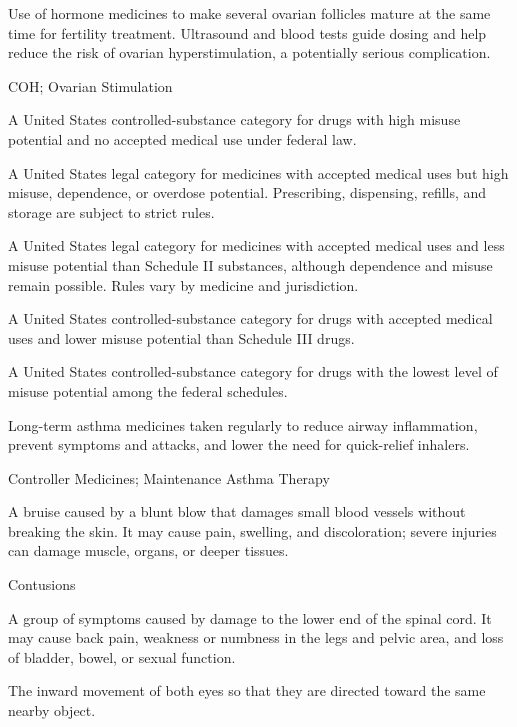  Use of hormone medicines to make several ovarian follicles mature at the same time for fertility treatment. Ultrasound and blood tests guide dosing and help reduce the risk of ovarian hyperstimulation, a potentially serious complication.

\synonyms
COH; Ovarian Stimulation

 A United States controlled-substance category for drugs with high misuse potential and no accepted medical use
under federal law.

 A United States legal category for medicines with accepted medical uses but high misuse, dependence, or overdose potential. Prescribing, dispensing, refills, and storage are subject to strict rules.

 A United States legal category for medicines with accepted medical uses and less misuse potential than Schedule II substances, although dependence and misuse remain possible. Rules vary by medicine and jurisdiction.

 A United States controlled-substance category for drugs with accepted medical uses and lower misuse potential
than Schedule III drugs.

 A United States controlled-substance category for drugs with the lowest level of misuse potential among the
federal schedules.

 Long-term asthma medicines taken regularly to reduce airway inflammation, prevent symptoms and attacks, and lower the need for quick-relief inhalers.

\synonyms
Controller Medicines; Maintenance Asthma Therapy

 A bruise caused by a blunt blow that damages small blood vessels without breaking the skin. It may cause pain, swelling, and discoloration; severe injuries can damage muscle, organs, or deeper tissues.

\synonyms
Contusions

 A group of symptoms caused by damage to the lower end of the spinal cord. It may cause back pain, weakness or numbness in the legs and pelvic area, and loss of bladder, bowel, or sexual function.

 The inward movement of both eyes so that they are directed toward the same nearby object.

